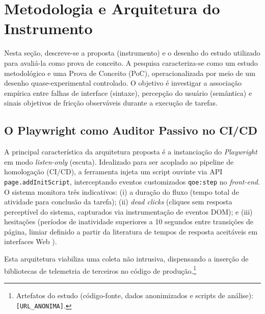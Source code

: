 \documentclass[12pt]{article}
\begin{document}
\section{Metodologia e Arquitetura do Instrumento}

Nesta seção, descreve-se a proposta (instrumento) e o desenho do estudo utilizado para avaliá-la como prova de conceito. A pesquisa caracteriza-se como um estudo metodológico e uma Prova de Conceito (PoC), operacionalizada por meio de um desenho quase-experimental controlado. O objetivo é investigar a associação empírica entre falhas de interface (sintaxe), percepção do usuário (semântica) e sinais objetivos de fricção observáveis durante a execução de tarefas.

\subsection{O Playwright como Auditor Passivo no CI/CD}

A principal característica da arquitetura proposta é a instanciação do \textit{Playwright} em modo \textit{listen-only} (escuta). Idealizado para ser acoplado ao pipeline de homologação (CI/CD), a ferramenta injeta um script ouvinte via API \texttt{page.addInitScript}, interceptando eventos customizados \texttt{qoe:step} no \textit{front-end}. O sistema monitora três indicativos:
 (i) a duração do fluxo (tempo total de atividade para conclusão da tarefa); (ii) \textit{dead clicks} (cliques sem resposta perceptível do sistema, capturados via instrumentação de eventos DOM); e (iii) hesitações (períodos de inatividade superiores a 10 segundos entre transições de página, limiar definido a partir da literatura de tempos de resposta aceitáveis em interfaces Web \cite{nielsen1994}).

Esta arquitetura viabiliza uma coleta não intrusiva, dispensando a inserção de bibliotecas de telemetria de terceiros no código de produção.\footnote{Artefatos do estudo (código-fonte, dados anonimizados e scripts de análise): \texttt{[URL\_ANONIMA]}.}
\end{document}
